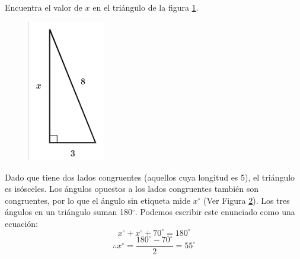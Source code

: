 Encuentra el valor de $x$ en el triángulo de la figura \ref{fig:lados_pitagoras_32}.

\begin{minipage}[t][][t]{0.35\textwidth}
    \begin{figure}[H]
        \centering
        \includegraphics[width=0.3\textwidth]{../images/lados_pitagoras_32.png}

        \caption{}
        \label{fig:lados_pitagoras_32}
    \end{figure}
\end{minipage}\hfill
\begin{minipage}[t][][t]{0.6\textwidth}
    \begin{solutionbox}{8cm}
        \begin{minipage}{0.3\textwidth}
            \begin{figure}[H]
                \centering
                \caption{}
                \label{fig:findangle10a}
            \end{figure}
        \end{minipage}\hfill
        \begin{minipage}{0.65\textwidth}
            Dado que tiene dos lados congruentes (aquellos cuya longitud es 5), el triángulo es isósceles. Los ángulos opuestos a los lados congruentes también son congruentes, por lo que el ángulo sin etiqueta mide $x^\circ$ (Ver Figura \ref{fig:findangle10a}).
            Los tres ángulos en un triángulo suman 180$^\circ$. Podemos escribir este enunciado como una ecuación:
            \[x^\circ + x^\circ + 70^\circ = 180^\circ \]
            \[\therefore x^\circ = \dfrac{180^\circ - 70^\circ}{2}  = 55^\circ\]
        \end{minipage}
    \end{solutionbox}
\end{minipage}
